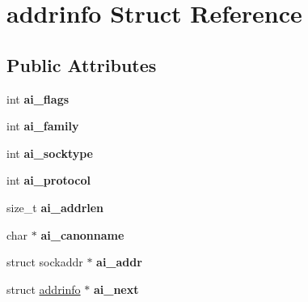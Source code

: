\hypertarget{structaddrinfo}{
\section{addrinfo Struct Reference}
\label{structaddrinfo}
}
\subsection*{Public Attributes}
\begin{DoxyCompactItemize}
\item 
\hypertarget{structaddrinfo_ad0b4d4a9e417a5971162cba19597fcc3}{
int {\bfseries ai\_\-flags}}
\label{structaddrinfo_ad0b4d4a9e417a5971162cba19597fcc3}

\item 
\hypertarget{structaddrinfo_af8ba790dc4c689a8b38c947924afe3ee}{
int {\bfseries ai\_\-family}}
\label{structaddrinfo_af8ba790dc4c689a8b38c947924afe3ee}

\item 
\hypertarget{structaddrinfo_a2b71233551bb3d551ad76ddd27ced896}{
int {\bfseries ai\_\-socktype}}
\label{structaddrinfo_a2b71233551bb3d551ad76ddd27ced896}

\item 
\hypertarget{structaddrinfo_a70984f8a57396a9cb6593bc6c030a06c}{
int {\bfseries ai\_\-protocol}}
\label{structaddrinfo_a70984f8a57396a9cb6593bc6c030a06c}

\item 
\hypertarget{structaddrinfo_a225a0fc5785f7956c4444ef799317994}{
size\_\-t {\bfseries ai\_\-addrlen}}
\label{structaddrinfo_a225a0fc5785f7956c4444ef799317994}

\item 
\hypertarget{structaddrinfo_a8ec2c67f514b6ae82d0ed22734cb63ef}{
char $\ast$ {\bfseries ai\_\-canonname}}
\label{structaddrinfo_a8ec2c67f514b6ae82d0ed22734cb63ef}

\item 
\hypertarget{structaddrinfo_a563a8667f9e3b29cf3b69628d24e7f70}{
struct sockaddr $\ast$ {\bfseries ai\_\-addr}}
\label{structaddrinfo_a563a8667f9e3b29cf3b69628d24e7f70}

\item 
\hypertarget{structaddrinfo_afd8bb22f483192d5f4c6c63c7bdee4ca}{
struct \hyperlink{structaddrinfo}{addrinfo} $\ast$ {\bfseries ai\_\-next}}
\label{structaddrinfo_afd8bb22f483192d5f4c6c63c7bdee4ca}

\end{DoxyCompactItemize}



